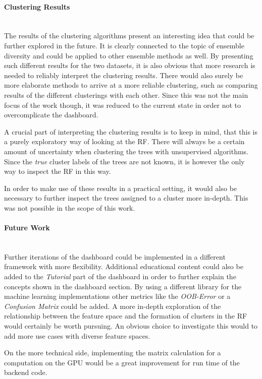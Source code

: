 \documentclass[a4paper, 12pt]{article}
\begin{document}
\paragraph{Clustering Results}\mbox{}\\
The results of the clustering algorithms present an interesting idea that could be further explored in the
future. It is clearly connected to the topic of ensemble diversity and could be applied to other ensemble
methods as well. By presenting such different results for the two datasets, it is also obvious that more
research is needed to reliably interpret the clustering results. There would also surely be more elaborate
methods to arrive at a more reliable clustering, such as comparing results of the different clusterings
with each other. Since this was not the main focus of the work though, it was reduced to the current state
in order not to overcomplicate the dashboard. \par
A crucial part of interpreting the clustering results is to keep in mind, that this is a purely exploratory
way of looking at the RF. There will always be a certain amount of uncertainty when clustering the trees
with unsupervised algorithms. Since the \textit{true} cluster labels of the trees are not known, it is
however the only way to inspect the RF in this way. \par
In order to make use of these results in a practical setting, it would also be necessary to further inspect
the trees assigned to a cluster more in-depth. This was not possible in the scope of this work. \par

\paragraph{Future Work}\mbox{}\\
Further iterations of the dashboard could be implemented in a different framework with more flexibility.
Additional educational content could also be added to the \textit{Tutorial} part of the dashboard in order to
further explain the concepts shown in the dashboard section. By using a different library for the machine
learning implementations other metrics like the \textit{OOB-Error} or a \textit{Confusion Matrix} could be
added. A more in-depth exploration of the relationship between the feature space and the formation of clusters
in the RF would certainly be worth pursuing. An obvious choice to investigate this would to add more use cases
with diverse feature spaces. \par
On the more technical side, implementing the matrix calculation for a computation on the GPU would be a great
improvement for run time of the backend code.
\end{document}
